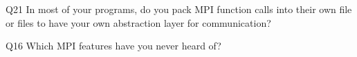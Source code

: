 \begin{description}%
\item{Q21} In most of your programs, do you pack MPI function calls into their own file or files to have your own abstraction layer for communication?%
\item{Q16} Which MPI features have you never heard of?%
\end{description}%
